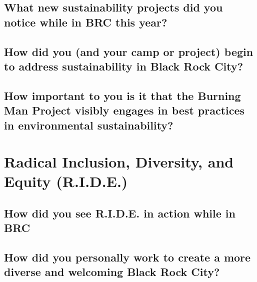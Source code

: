 \documentclass[
]{book}
\begin{document}
\hypertarget{what-new-sustainability-projects-did-you-notice-while-in-brc-this-year}{%
\subsection{What new sustainability projects did you notice while in BRC this year?}\label{what-new-sustainability-projects-did-you-notice-while-in-brc-this-year}}

\hypertarget{how-did-you-and-your-camp-or-project-begin-to-address-sustainability-in-black-rock-city}{%
\subsection{How did you (and your camp or project) begin to address sustainability in Black Rock City?}\label{how-did-you-and-your-camp-or-project-begin-to-address-sustainability-in-black-rock-city}}

\hypertarget{how-important-to-you-is-it-that-the-burning-man-project-visibly-engages-in-best-practices-in-environmental-sustainability}{%
\subsection{How important to you is it that the Burning Man Project visibly engages in best practices in environmental sustainability?}\label{how-important-to-you-is-it-that-the-burning-man-project-visibly-engages-in-best-practices-in-environmental-sustainability}}

\hypertarget{radical-inclusion-diversity-and-equity-r.i.d.e.}{%
\section{Radical Inclusion, Diversity, and Equity (R.I.D.E.)}\label{radical-inclusion-diversity-and-equity-r.i.d.e.}}

\hypertarget{how-did-you-see-r.i.d.e.-in-action-while-in-brc}{%
\subsection{How did you see R.I.D.E. in action while in BRC}\label{how-did-you-see-r.i.d.e.-in-action-while-in-brc}}

\hypertarget{how-did-you-personally-work-to-create-a-more-diverse-and-welcoming-black-rock-city}{%
\subsection{How did you personally work to create a more diverse and welcoming Black Rock City?}\label{how-did-you-personally-work-to-create-a-more-diverse-and-welcoming-black-rock-city}}
\end{document}
